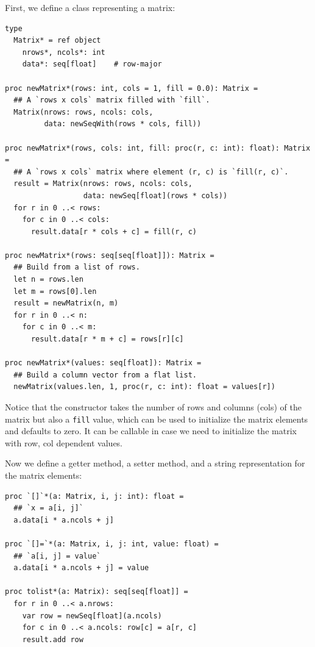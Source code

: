 \documentclass[justified, sixbynine]{tufte-book}
\def\ft{\small\tt}
\theoremstyle{plain}%
\newtheorem * {corollary}{Corollary}
\theoremstyle{definition}
\theoremstyle{remark}
\newtheorem * {remark}{Remark}
\newtheorem * {note}{Note}
\begin{document}
\begin{fullwidth}
First, we define a class representing a matrix:


\begin{lstlisting}[caption={in file: {\ft nlib/matrix.nim}}]
type
  Matrix* = ref object
    nrows*, ncols*: int
    data*: seq[float]    # row-major

proc newMatrix*(rows: int, cols = 1, fill = 0.0): Matrix =
  ## A `rows x cols` matrix filled with `fill`.
  Matrix(nrows: rows, ncols: cols,
         data: newSeqWith(rows * cols, fill))

proc newMatrix*(rows, cols: int, fill: proc(r, c: int): float): Matrix =
  ## A `rows x cols` matrix where element (r, c) is `fill(r, c)`.
  result = Matrix(nrows: rows, ncols: cols,
                  data: newSeq[float](rows * cols))
  for r in 0 ..< rows:
    for c in 0 ..< cols:
      result.data[r * cols + c] = fill(r, c)

proc newMatrix*(rows: seq[seq[float]]): Matrix =
  ## Build from a list of rows.
  let n = rows.len
  let m = rows[0].len
  result = newMatrix(n, m)
  for r in 0 ..< n:
    for c in 0 ..< m:
      result.data[r * m + c] = rows[r][c]

proc newMatrix*(values: seq[float]): Matrix =
  ## Build a column vector from a flat list.
  newMatrix(values.len, 1, proc(r, c: int): float = values[r])
\end{lstlisting}

Notice that the constructor takes the number of rows and columns (cols) of the matrix but also a {\ft fill} value, which can be used to initialize the matrix elements and defaults to zero. It can be callable in case we need to initialize the matrix with row, col dependent values.

Now we define a getter method, a setter method, and a string representation for the matrix elements:

\begin{lstlisting}[caption={in file: {\ft nlib/matrix.nim}}]
proc `[]`*(a: Matrix, i, j: int): float =
  ## `x = a[i, j]`
  a.data[i * a.ncols + j]

proc `[]=`*(a: Matrix, i, j: int, value: float) =
  ## `a[i, j] = value`
  a.data[i * a.ncols + j] = value

proc tolist*(a: Matrix): seq[seq[float]] =
  for r in 0 ..< a.nrows:
    var row = newSeq[float](a.ncols)
    for c in 0 ..< a.ncols: row[c] = a[r, c]
    result.add row


\end{lstlisting}
\end{fullwidth}
\end{document}
